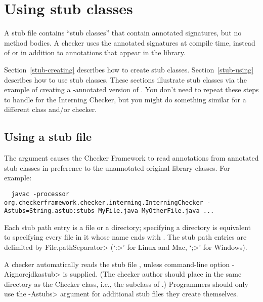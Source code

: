 \section{Using stub classes\label{stub}\label{stub-creating-and-using}}

A stub file contains ``stub classes'' that contain annotated signatures,
but no method bodies.  A
checker uses the annotated signatures at compile time, instead of or in
addition to annotations that appear in the library.

Section~\ref{stub-creating} describes how to create stub classes.
Section~\ref{stub-using} describes how to use stub classes.
These sections illustrate stub classes via the example of creating a -annotated
version of .  You don't need to repeat these steps
to handle  for the Interning Checker,
but you might do something similar for a different class and/or checker.



\subsection{Using a stub file\label{stub-using}}

The  argument causes the Checker Framework to read
annotations from annotated stub classes in preference to the unannotated
original library classes.  For example:

\begin{myxsmall}
\begin{Verbatim}
  javac -processor org.checkerframework.checker.interning.InterningChecker -Astubs=String.astub:stubs MyFile.java MyOtherFile.java ...
\end{Verbatim}
\end{myxsmall}

Each stub path entry is a file or a directory; specifying a directory is
equivalent to specifying every file in it whose name ends with
.  The stub path entries are delimited by
\<File.pathSeparator> (`\<:>' for Linux and Mac, `\<;>' for Windows).

A checker automatically reads the stub file , unless
command-line option \<-Aignorejdkastub> is supplied.  (The checker
author should place  in the same directory as the Checker class, i.e.,
the subclass of .)  Programmers should only use the
\<-Astubs> argument for additional stub files they create themselves.

